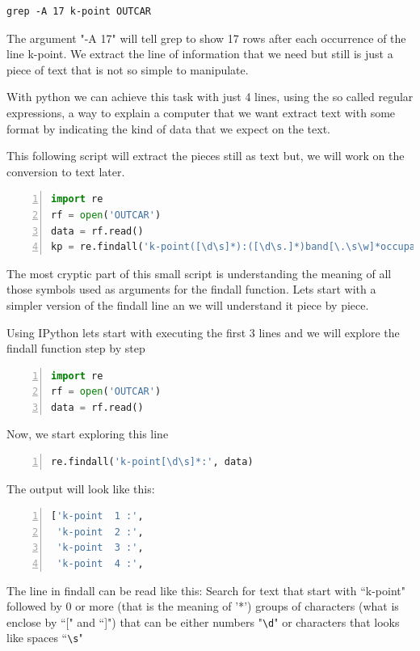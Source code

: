 \begin{lstlisting}
grep -A 17 k-point OUTCAR 
\end{lstlisting}

The argument "-A 17" will tell grep to show 17 rows after each occurrence of the line k-point.
We extract the line of information that we need but still is just a piece of text that is not so simple to manipulate.

With python we can achieve this task with just 4 lines, using the so called regular expressions, a way to explain a computer that we want extract text with some format by indicating the kind of data that we expect on the text.

This following script will extract the pieces still as text but, we will work on the conversion to text later.

\begin{lstlisting}[language=Python, numbers=left]
import re
rf = open('OUTCAR')
data = rf.read()
kp = re.findall('k-point([\d\s]*):([\d\s.]*)band[\.\s\w]*occupation([\s\d:\-\.]*)\n\n', data)
\end{lstlisting}

The most cryptic part of this small script is understanding the meaning of all those symbols used as arguments for the findall function.
Lets start with a simpler version of the findall line an we will understand it piece by piece.

Using IPython lets start with executing the first 3 lines and we will explore the findall function step by step

\begin{lstlisting}[language=Python, numbers=left]
import re
rf = open('OUTCAR')
data = rf.read()
\end{lstlisting}

Now, we start exploring this line

\begin{lstlisting}[language=Python, numbers=left]
re.findall('k-point[\d\s]*:', data)
\end{lstlisting}

The output will look like this:

\begin{lstlisting}[language=Python, numbers=left]
['k-point  1 :',
 'k-point  2 :',
 'k-point  3 :',
 'k-point  4 :',
\end{lstlisting}

The line in findall can be read like this: Search for text that start with ``k-point" followed by 0 or more (that is the meaning of '*') groups of characters (what is enclose by ``[" and ``]") that can be either numbers "\verb|\d|" or characters that looks like spaces ``\verb|\s|"

